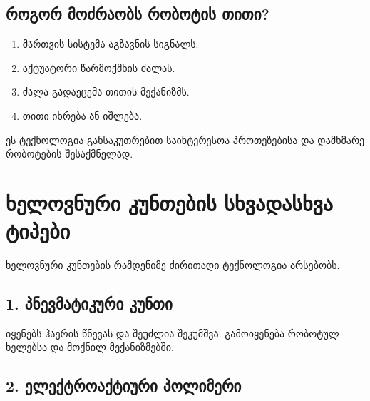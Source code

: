 \documentclass[12pt,a4paper]{article}
\begin{document}
\subsection{როგორ მოძრაობს რობოტის თითი?}

\begin{enumerate}
    \item მართვის სისტემა აგზავნის სიგნალს.
    \item აქტუატორი წარმოქმნის ძალას.
    \item ძალა გადაეცემა თითის მექანიზმს.
    \item თითი იხრება ან იშლება.
\end{enumerate}

ეს ტექნოლოგია განსაკუთრებით საინტერესოა პროთეზებისა და დამხმარე რობოტების შესაქმნელად.


\section{ხელოვნური კუნთების სხვადასხვა ტიპები}

ხელოვნური კუნთების რამდენიმე ძირითადი ტექნოლოგია არსებობს.

\subsection{1. პნევმატიკური კუნთი}

\begin{center}
\end{center}

იყენებს ჰაერის წნევას და შეუძლია შეკუმშვა. გამოიყენება რობოტულ ხელებსა და მოქნილ მექანიზმებში.

\subsection{2. ელექტროაქტიური პოლიმერი}

\begin{center}
\end{center}
\end{document}
